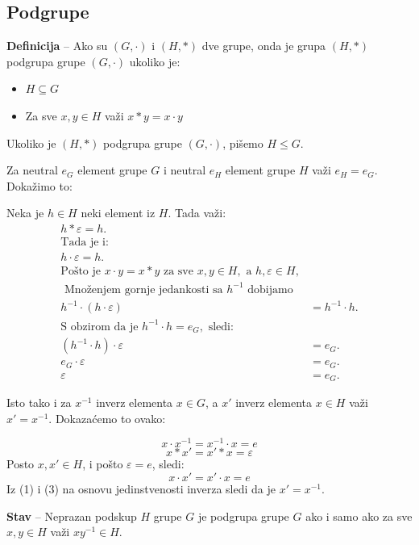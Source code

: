 \documentclass[a4paper,12pt]{article}
\begin{document}
\subsection{Podgrupe}

\textbf{Definicija} -- Ako su \( (G, \cdot)\) i \((H, * ) \) dve grupe, onda je grupa \( (H, * ) \) podgrupa grupe \( (G, \cdot) \) ukoliko je:

\begin{itemize}
  \item \( H \subseteq G \)
  \item Za sve \( x, y \in H \) važi \( x * y = x \cdot y \)
\end{itemize}
Ukoliko je \( (H, * ) \) podgrupa grupe \( (G, \cdot) \), pišemo \( H \leq G \).
\medskip

Za neutral \( e_G \) element grupe \( G \) i neutral \( e_H \) element grupe \( H \) važi \( e_H = e_G \).
Dokažimo to: 

Neka je \(h \in H \) neki element iz \( H \). Tada važi:
\[\begin{aligned}
  h*\varepsilon = h. \\
  \text{Tada je i: } \\
  h \cdot \varepsilon = h. \\
  \text{Pošto je } x \cdot y = x * y \text{ za sve } x, y \in H, \text{ a } h, \varepsilon \in H, \\
  \text{ Množenjem gornje jedankosti sa } h^{-1} \text{ dobijamo } \\
  h^{-1} \cdot (h \cdot \varepsilon) &= h^{-1} \cdot h. \\
  \text{S obzirom da je } h^{-1} \cdot h = e_G, \text{ sledi: } \\
  (h^{-1} \cdot h) \cdot \varepsilon &= e_G. \\
  e_G \cdot \varepsilon &= e_G. \\
  \varepsilon &= e_G. 
\end{aligned}\]

Isto tako i za \( x^{-1} \) inverz elementa \( x \in G \), a \( x' \) inverz elementa \( x \in H \) važi \( x' = x^{-1} \).
Dokazaćemo to ovako:

\[
  x \cdot x^{-1} = x^{-1} \cdot x = e \tag{1}
\]
\[
  x * x' = x' * x = \varepsilon \tag{2}
\]
Posto \( x, x' \in H \), i pošto \( \varepsilon = e \), sledi:
\[
  x \cdot x' = x' \cdot x = e \tag{3}
\]
Iz (1) i (3) na osnovu jedinstvenosti inverza sledi da je \( x' = x^{-1} \).

\bigskip
\textbf{Stav} -- Neprazan podskup \( H \) grupe \( G \) je podgrupa grupe \( G \) ako i samo ako za sve \( x, y \in H \) važi \( xy^{-1} \in H \).
\end{document}
